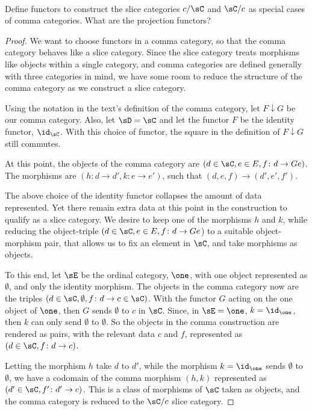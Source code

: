 \documentclass[main.tex]{subfiles}
\begin{document}
\paragraph{}
\begin{exercise}
	Define functors to construct the slice categories $c/\sC$ and $\sC/c$ as special
	cases of comma categories. What are the projection functors?
\end{exercise}

\begin{proof}
	We want to choose functors in a comma category, so that the comma category
	behaves like a slice category. Since the slice category treats morphisms
	like objects within a single category, and comma categories are defined
	generally with three categories in mind, we have some room to reduce the
	structure of the comma category as we construct a slice category.

	Using the notation in the text's definition of the comma category, let
	$F\downarrow G$ be our comma category. Also, let $\sD = \sC$ and let the functor
	$F$ be the identity functor, $\id_\sC$. With this choice of functor, the
	square in the definition of $F\downarrow G$ still commutes.

	At this point, the objects of the comma category are $(d \in \sC, e\in E, f\colon d
	\rightarrow Ge)$. The morphisms are $(h\colon d\rightarrow d', k\colon e\rightarrow
	e')$, such that $(d,e,f) \rightarrow (d',e',f')$.

	The above choice of the identity functor collapses the amount of data
	represented. Yet there remain extra data at this point in the construction
	to qualify as a slice category. We desire to keep one of the morphisms $h$
	and $k$, while reducing the object-triple $(d \in \sC, e\in E, f\colon d
	\rightarrow Ge$) to a suitable object-morphism pair, that allows us to fix
	an element in \(\sC\), and take morphisms as objects.

	To this end, let \(\sE\) be the ordinal category, $\one$, with one object
	represented as $\emptyset$, and only the identity morphism. The objects in
	the comma category now are the triples $(d \in \sC, \emptyset, f\colon d
	\rightarrow c \in \sC)$. With the functor $G$ acting on the one object of
	$\one$, then $G$ sends $\emptyset$ to $ c $ in $\sC$. Since, in $\sE =
	\one$, $k = \id_{\one}$, then $k$ can only send $\emptyset$ to
	$\emptyset$. So the objects in the comma construction are rendered as pairs,
	with the relevant data $c$ and $f$, represented as $(d \in \sC, f\colon d
	\rightarrow c)$.

	Letting the morphism $h$ take $d$ to $d'$, while the morphism $k =
	\id_{\one}$ sends $\emptyset$ to $\emptyset$, we have a codomain of the
	comma morphism $(h,k)$ represented as $(d' \in \sC, f'\colon d' \rightarrow
	c)$. This is a class of morphisms of \(\sC\) taken as objects, and the comma
	category is reduced to the $\sC/c$ slice category.
\end{proof}
\end{document}
